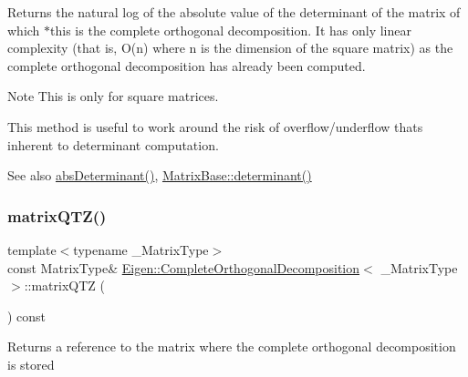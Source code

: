 \begin{DoxyReturn}{Returns}
the natural log of the absolute value of the determinant of the matrix of which $\ast$this is the complete orthogonal decomposition. It has only linear complexity (that is, O(n) where n is the dimension of the square matrix) as the complete orthogonal decomposition has already been computed.
\end{DoxyReturn}
\begin{DoxyNote}{Note}
This is only for square matrices.

This method is useful to work around the risk of overflow/underflow that\textquotesingle{}s inherent to determinant computation.
\end{DoxyNote}
\begin{DoxySeeAlso}{See also}
\mbox{\hyperlink{class_eigen_1_1_complete_orthogonal_decomposition_ac040c34ce3fb2b68d3f57adc0c29d526}{abs\+Determinant()}}, \mbox{\hyperlink{class_eigen_1_1_matrix_base_a7ad8f77004bb956b603bb43fd2e3c061}{Matrix\+Base\+::determinant()}} 
\end{DoxySeeAlso}
\mbox{\label{class_eigen_1_1_complete_orthogonal_decomposition_ad89e2529fc1a8721239d9b6be9613a69}} 
\subsubsection{\texorpdfstring{matrixQTZ()}{matrixQTZ()}}
{\footnotesize\ttfamily template$<$typename \+\_\+\+Matrix\+Type$>$ \\
const Matrix\+Type\& \mbox{\hyperlink{class_eigen_1_1_complete_orthogonal_decomposition}{Eigen\+::\+Complete\+Orthogonal\+Decomposition}}$<$ \+\_\+\+Matrix\+Type $>$\+::matrix\+Q\+TZ (\begin{DoxyParamCaption}{ }\end{DoxyParamCaption}) const\hspace{0.3cm}{\ttfamily [inline]}}

\begin{DoxyReturn}{Returns}
a reference to the matrix where the complete orthogonal decomposition is stored 
\end{DoxyReturn}
\mbox{\label{class_eigen_1_1_complete_orthogonal_decomposition_a806213f5c96ff765265f47067229586d}} 
